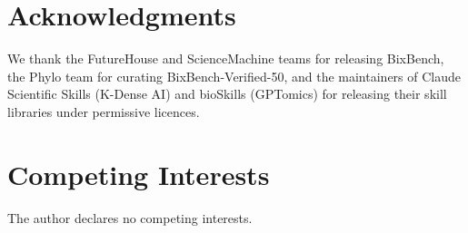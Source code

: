 \documentclass[11pt]{article}
\begin{document}
\section*{Acknowledgments}
We thank the FutureHouse and ScienceMachine teams for releasing
BixBench, the Phylo team for curating BixBench-Verified-50, and the
maintainers of Claude Scientific Skills (K-Dense AI) and bioSkills
(GPTomics) for releasing their skill libraries under permissive
licences.

\section*{Competing Interests}
The author declares no competing interests.



\end{document}
